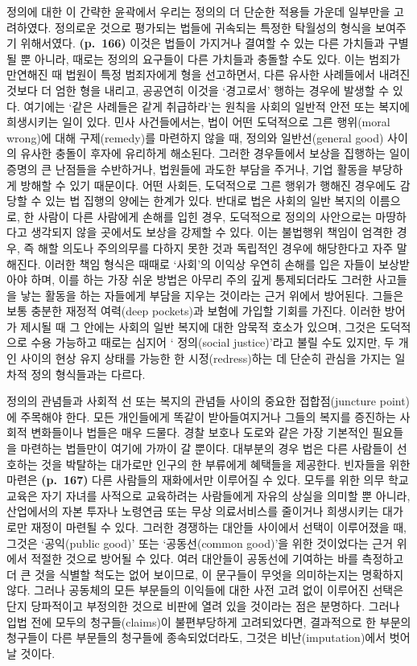정의에 대한 이 간략한 윤곽에서 우리는 정의의 더 단순한 적용들 가운데
일부만을 고려하였다. 정의로운 것으로 평가되는 법들에 귀속되는 특정한
탁월성의 형식을 보여주기 위해서였다. \textbf{(p.~166)} 이것은 법들이
가지거나 결여할 수 있는 다른 가치들과 구별될 뿐 아니라, 때로는 정의의
요구들이 다른 가치들과 충돌할 수도 있다. 이는 범죄가 만연해진 때 법원이
특정 범죄자에게 형을 선고하면서, 다른 유사한 사례들에서 내려진 것보다 더
엄한 형을 내리고, 공공연히 이것을 ‘경고로서’ 행하는 경우에 발생할 수
있다. 여기에는 ‘같은 사례들은 같게 취급하라’는 원칙을 사회의 일반적 안전
또는 복지에 희생시키는 일이 있다. 민사 사건들에서는, 법이 어떤
도덕적으로 그른 행위(moral wrong)에 대해 구제(remedy)를 마련하지 않을
때, 정의와 일반선(general good) 사이의 유사한 충돌이 후자에 유리하게
해소된다. 그러한 경우들에서 보상을 집행하는 일이 증명의 큰 난점들을
수반하거나, 법원들에 과도한 부담을 주거나, 기업 활동을 부당하게 방해할
수 있기 때문이다. 어떤 사회든, 도덕적으로 그른 행위가 행해진 경우에도
감당할 수 있는 법 집행의 양에는 한계가 있다. 반대로 법은 사회의 일반
복지의 이름으로, 한 사람이 다른 사람에게 손해를 입힌 경우, 도덕적으로
정의의 사안으로는 마땅하다고 생각되지 않을 곳에서도 보상을 강제할 수
있다. 이는 불법행위 책임이 엄격한 경우, 즉 해할 의도나 주의의무를 다하지
못한 것과 독립적인 경우에 해당한다고 자주 말해진다. 이러한 책임 형식은
때때로 ‘사회’의 이익상 우연히 손해를 입은 자들이 보상받아야 하며, 이를
하는 가장 쉬운 방법은 아무리 주의 깊게 통제되더라도 그러한 사고들을 낳는
활동을 하는 자들에게 부담을 지우는 것이라는 근거 위에서 방어된다. 그들은
보통 충분한 재정적 여력(deep pockets)과 보험에 가입할 기회를 가진다.
이러한 방어가 제시될 때 그 안에는 사회의 일반 복지에 대한 암묵적 호소가
있으며, 그것은 도덕적으로 수용 가능하고 때로는 심지어 ‘
정의(social justice)’라고 불릴 수도 있지만, 두 개인 사이의 현상 유지
상태를 가능한 한 시정(redress)하는 데 단순히 관심을 가지는 일차적 정의
형식들과는 다르다.

정의의 관념들과 사회적 선 또는 복지의 관념들 사이의 중요한
접합점(juncture point)에 주목해야 한다. 모든 개인들에게 똑같이
받아들여지거나 그들의 복지를 증진하는 사회적 변화들이나 법들은 매우
드물다. 경찰 보호나 도로와 같은 가장 기본적인 필요들을 마련하는 법들만이
여기에 가까이 갈 뿐이다. 대부분의 경우 법은 다른 사람들이 선호하는 것을
박탈하는 대가로만 인구의 한 부류에게 혜택들을 제공한다. 빈자들을 위한
마련은 \textbf{(p.~167)} 다른 사람들의 재화에서만 이루어질 수 있다.
모두를 위한 의무 학교교육은 자기 자녀를 사적으로 교육하려는 사람들에게
자유의 상실을 의미할 뿐 아니라, 산업에서의 자본 투자나 노령연금 또는
무상 의료서비스를 줄이거나 희생시키는 대가로만 재정이 마련될 수 있다.
그러한 경쟁하는 대안들 사이에서 선택이 이루어졌을 때, 그것은
‘공익(public good)’ 또는 ‘공동선(common good)’을 위한 것이었다는 근거
위에서 적절한 것으로 방어될 수 있다. 여러 대안들이 공동선에 기여하는
바를 측정하고 더 큰 것을 식별할 척도는 없어 보이므로, 이 문구들이 무엇을
의미하는지는 명확하지 않다. 그러나 공동체의 모든 부문들의 이익들에 대한
사전 고려 없이 이루어진 선택은 단지 당파적이고 부정의한 것으로 비판에
열려 있을 것이라는 점은 분명하다. 그러나 입법 전에 모두의
청구들(claims)이 불편부당하게 고려되었다면, 결과적으로 한 부문의
청구들이 다른 부문들의 청구들에 종속되었더라도, 그것은 
비난(imputation)에서 벗어날 것이다.

